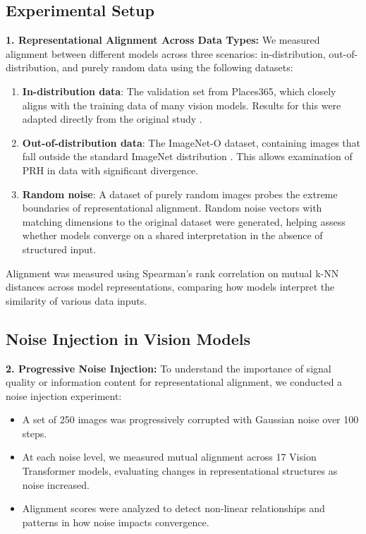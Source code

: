 \documentclass[10pt,a4paper]{article}
\begin{document}
\subsection{Experimental Setup}
\textbf{1. Representational Alignment Across Data Types:} We measured alignment between different models across three scenarios: in-distribution, out-of-distribution, and purely random data using the following datasets:
\begin{enumerate}
    \item \textbf{In-distribution data}: The validation set from Places365, which closely aligns with the training data of many vision models. Results for this were adapted directly from the original study \cite{huh2024prh}.
    \item \textbf{Out-of-distribution data}: The ImageNet-O dataset, containing images that fall outside the standard ImageNet distribution \cite{hendrycks2021nae}. This allows examination of PRH in data with significant divergence.
    \item \textbf{Random noise}: A dataset of purely random images probes the extreme boundaries of representational alignment. Random noise vectors with matching dimensions to the original dataset were generated, helping assess whether models converge on a shared interpretation in the absence of structured input.
\end{enumerate}

Alignment was measured using Spearman's rank correlation on mutual k-NN distances across model representations, comparing how models interpret the similarity of various data inputs.

\subsection{Noise Injection in Vision Models}
\textbf{2. Progressive Noise Injection:} To understand the importance of signal quality or information content for representational alignment, we conducted a noise injection experiment:
\begin{itemize}
    \item A set of 250 images was progressively corrupted with Gaussian noise over 100 steps.
    \item At each noise level, we measured mutual alignment across 17 Vision Transformer models, evaluating changes in representational structures as noise increased.
    \item Alignment scores were analyzed to detect non-linear relationships and patterns in how noise impacts convergence.
\end{itemize}
\end{document}
